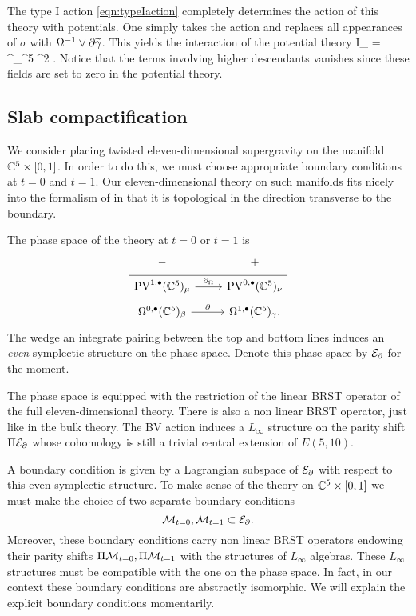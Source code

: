 The type I action \eqref{eqn:typeIaction} completely determines the action of this theory with potentials. 
One simply takes the action and replaces all appearances of $\sigma$ with $\Omega^{-1} \vee \partial \widetilde\gamma$. 
This yields the interaction of the potential theory
\beqn\label{eqn:Iactionpot}
\til I_{} =  \int^\Omega_{\CC^5}  \mu^2 \vee \del \til\gamma .
\eeqn
Notice that the terms involving higher descendants vanishes since these fields are set to zero in the potential theory.

\subsection{Slab compactification}\label{s:Ired}

We consider placing twisted eleven-dimensional supergravity on the manifold $\mathbb C^5 \times [0,1]$. 
In order to do this, we must choose appropriate boundary conditions at $t=0$ and $t=1$.
Our eleven-dimensional theory on such manifolds fits nicely into the formalism of \cite{BY,Eugene} in that it is topological in the direction transverse to the boundary.  

The phase space of the theory at $t=0$ or $t=1$ is 
\begin{equation}
  \label{eq:lin1} 
  \begin{tikzcd}[row sep = 1 ex]
    - & + \\ \hline
    \PV^{1,\bu}(\CC^5)_\mu \ar[r, "\div"] & \PV^{0,\bu}(\CC^5)_\nu \\ 
     \Omega^{0,\bu}(\CC^5)_\beta \ar[r, "\del"] & \Omega^{1,\bu}(\CC^5)_\gamma.
\end{tikzcd}
\end{equation}
The wedge an integrate pairing between the top and bottom lines induces an {\em even} symplectic structure on the phase space. 
Denote this phase space by $\mathcal E_{\partial}$ for the moment.

The phase space is equipped with the restriction of the linear BRST operator of the full eleven-dimensional theory. 
There is also a non linear BRST operator, just like in the bulk theory.
The BV action induces a $L_\infty$ structure on the parity shift $\Pi\mathcal E_{\partial}$ whose cohomology is still a trivial central extension of $E(5,10)$. 

A boundary condition is given by a Lagrangian subspace of $\mathcal E_{\partial}$ with respect to this even symplectic structure. 
To make sense of the theory on $\mathbb C^5 \times [0,1]$ we must make the choice of two separate boundary conditions 
\[
\mathcal M_{t=0} , \mathcal M_{t=1} \subset \mathcal E_{\partial} .
\]
Moreover, these boundary conditions carry non linear BRST operators endowing their parity shifts $\Pi \mathcal M_{t=0} , \Pi\mathcal M_{t=1}$ with the structures of $L_\infty$ algebras. 
These $L_\infty$ structures must be compatible with the one on the phase space.
In fact, in our context these boundary conditions are abstractly isomorphic. 
We will explain the explicit boundary conditions momentarily. 

